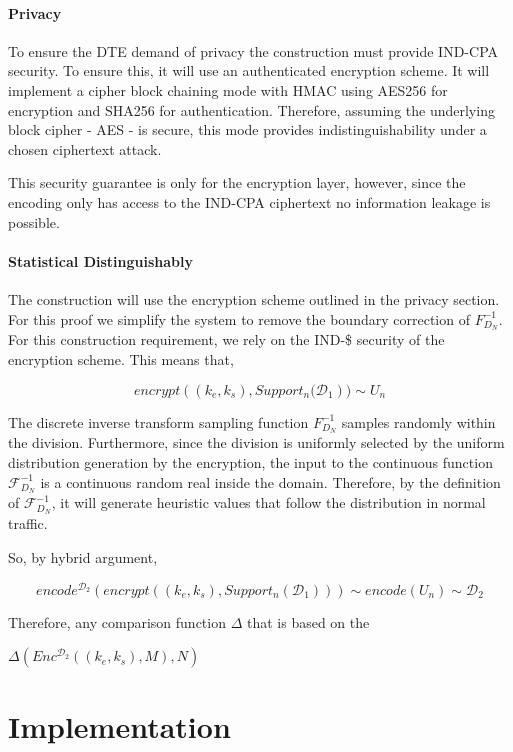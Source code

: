 \documentclass[ %
                    author={Samuel Russell},
                supervisor={Prof. Bogdan Warinschi},
                    degree={MEng},
                     title={Innocuous Ciphertexts},
                  subtitle={The DE-CENSOR Scheme},
                      type={research},
                      year={2018} ]{dissertation}
\begin{document}
\subsubsection{Privacy}

To ensure the DTE demand of privacy the construction must provide IND-CPA security.
To ensure this, it will use an authenticated encryption scheme.
It will implement a cipher block chaining mode with HMAC using AES256 for encryption and SHA256 for authentication.
Therefore, assuming the underlying block cipher - AES - is secure, this mode provides indistinguishability under a chosen ciphertext attack.

This security guarantee is only for the encryption layer, however, since the encoding only has access to the IND-CPA ciphertext no information leakage is possible.

\subsubsection{Statistical Distinguishably}


The construction will use the encryption scheme outlined in the privacy section.
For this proof we simplify the system to remove the boundary correction of $F^{-1}_{D_N}$.
For this construction requirement, we rely on the IND-\$ security of the encryption scheme.
This means that, 

$$ encrypt \left( (k_e, k_s), Support_n(\mathcal{D}_1 \right) ) \sim  U_n$$ 

The discrete inverse transform sampling function $F^{-1}_{D_N}$ samples randomly within the division.
Furthermore, since the division is uniformly selected by the uniform distribution generation by the encryption, the input to the continuous function $\mathcal{F}^{-1}_{D_N}$ is a continuous random real inside the domain.
Therefore, by the definition of $\mathcal{F}^{-1}_{D_N}$, it will generate heuristic values that follow the distribution in normal traffic.

So, by hybrid argument,

$$ encode^{\mathcal{D}_2} \left( encrypt \left( (k_e, k_s), Support_n(\mathcal{D}_1) \right) \right) \sim  encode \left( U_n \right) \sim \mathcal{D}_2$$

Therefore, any comparison function $\Delta$ that is based on the 

$\Delta \left(  Enc^{\mathcal{D}_2}((k_e,k_s), M), N  \right)$

\chapter{Implementation}
\end{document}
